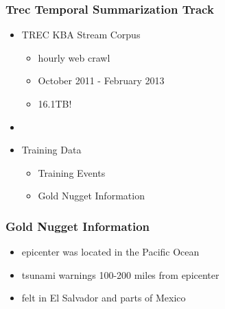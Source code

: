 \documentclass{beamer}
\begin{document}
\begin{frame}
\frametitle{Trec Temporal Summarization Track}
\begin{itemize}
\item TREC KBA Stream Corpus
\begin{itemize}
\item hourly web crawl
\item October 2011 - February 2013
\item 16.1TB!
\end{itemize}
\item[]
\item Training Data
\begin{itemize}
\item Training Events
\pause
\item Gold Nugget Information
\end{itemize}
\end{itemize}
\end{frame}


\begin{frame}
\frametitle{Gold Nugget Information}
\begin{itemize}
\item epicenter was located in the Pacific Ocean 
\item tsunami warnings 100-200 miles from epicenter
\item felt in El Salvador and parts of Mexico
\end{itemize}
\end{frame}
\end{document}
